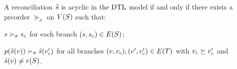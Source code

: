 \begin{lemma}\label{lem:reconciliation:rec-cons}
    A reconciliation \(\tilde{s}\) is acyclic in the \(\mathrm{D}\mathrm{T}\mathrm{L}\) model if and only if there exists a preorder \(\succeq_\sigma\) on \(V(S)\) such that:
    \begin{condition}
        \item \(s \succ_\sigma s_c\) for each branch \((s, s_c) \in E(S)\); \label{lem:reconciliation:rec-cons:hosts}
        \item \(p(\tilde{s}(v)) \succ_\sigma \tilde{s}(v'_c)\) for all branches \((v, v_c), (v', v'_c) \in E(T)\) with \(v_c \succeq v_c'\) and \(\tilde{s}(v) \neq r(S)\).
            \label{lem:reconciliation:rec-cons:host-switch}
    \end{condition}
\end{lemma}
